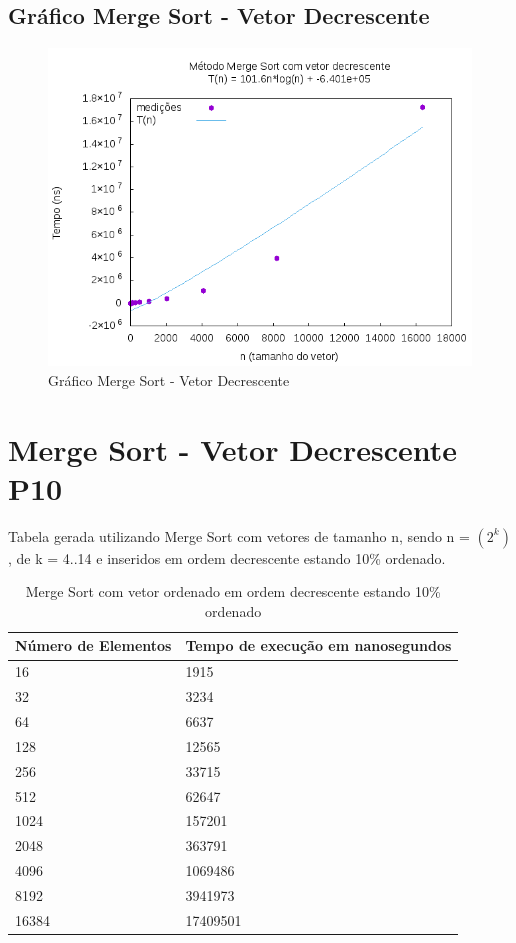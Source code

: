 \documentclass[12pt,a4paper,twoside]{report}
\begin{document}
\subsection{Gráfico Merge Sort - Vetor Decrescente}
\begin{figure}[H]
    \centering
    \includegraphics[width=0.7\linewidth]{graficos/MergeSort/vIntDecrescente/vIntDecrescente.png}
  \caption{Gráfico Merge Sort - Vetor Decrescente}
\end{figure}

\section{Merge Sort - Vetor Decrescente P10}
Tabela gerada utilizando Merge Sort com vetores de tamanho n, sendo n = $(2^k)$, de k = 4..14 e inseridos em ordem decrescente estando 10\% ordenado.
\begin{table}[H]
\centering
\caption{Merge Sort com vetor ordenado em ordem decrescente estando 10\% ordenado}
\label{my-label}
\begin{tabular}{|l|l|}
\hline
\multicolumn{1}{|c|}{\textbf{Número de Elementos}} & \multicolumn{1}{c|}{\textbf{Tempo de execução em nanosegundos}} \\ \hline
16 & 1915 \\ \hline
32 & 3234 \\ \hline
64 & 6637 \\ \hline
128 & 12565 \\ \hline
256 & 33715 \\ \hline
512 & 62647 \\ \hline
1024 & 157201 \\ \hline
2048 & 363791 \\ \hline
4096 & 1069486 \\ \hline
8192 & 3941973 \\ \hline
16384 & 17409501 \\ \hline
\end{tabular}
\end{table}
\end{document}
